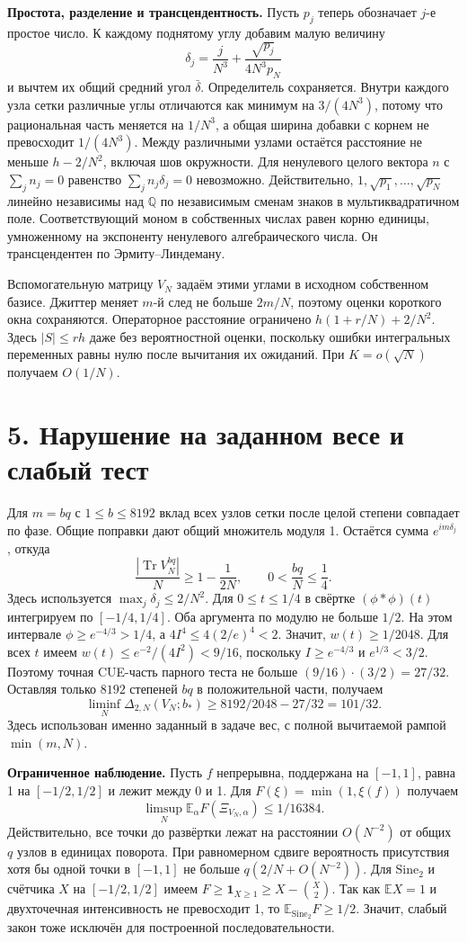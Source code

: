 \documentclass[11pt,a4paper]{article}
\newcommand{\Tr}{\operatorname{Tr}}
\newcommand{\EE}{\mathbb E}
\newcommand{\si}{\mathrm{Sine}_2}
\newcommand{\sect}[1]{\section*{\sffamily\color{ink}#1}}
\newcommand{\subt}[1]{\par\medskip\noindent\textbf{#1.}\quad}
\newcommand{\QQ}{\mathbb Q}
\begin{document}
\subt{Простота, разделение и трансцендентность}
Пусть \(p_j\) теперь обозначает \(j\)-е простое число. К каждому поднятому углу добавим малую величину
\[
          \delta_j=\frac{j}{N^3}
                   +\frac{\sqrt{p_j}}{4N^3p_N}
\]
и вычтем их общий средний угол \(\bar\delta\). Определитель сохраняется. Внутри каждого узла сетки различные углы отличаются как минимум на \(3/(4N^3)\), потому что рациональная часть меняется на \(1/N^3\), а общая ширина добавки с корнем не превосходит \(1/(4N^3)\). Между различными узлами остаётся расстояние не меньше \(h-2/N^2\), включая шов окружности. Для ненулевого целого вектора \(n\) с \(\sum_j n_j=0\) равенство \(\sum_j n_j\delta_j=0\) невозможно. Действительно, \(1,\sqrt{p_1},\ldots,\sqrt{p_N}\) линейно независимы над \(\QQ\) по независимым сменам знаков в мультиквадратичном поле. Соответствующий моном в собственных числах равен корню единицы, умноженному на экспоненту ненулевого алгебраического числа. Он трансцендентен по Эрмиту--Линдеману.

Вспомогательную матрицу \(V_N\) задаём этими углами в исходном собственном базисе. Джиттер меняет \(m\)-й след не больше \(2m/N\), поэтому оценки короткого окна сохраняются. Операторное расстояние ограничено \(h(1+r/N)+2/N^2\). Здесь \(|S|\le rh\) даже без вероятностной оценки, поскольку ошибки интегральных переменных равны нулю после вычитания их ожиданий. При \(K=o(\sqrt N)\) получаем \(O(1/N)\).

\newpage
\sect{5. Нарушение на заданном весе и слабый тест}
Для \(m=bq\) с \(1\le b\le8192\) вклад всех узлов сетки после целой степени совпадает по фазе. Общие поправки дают общий множитель модуля 1. Остаётся сумма \(e^{im\delta_j}\), откуда
\[
         \frac{|\Tr V_N^{bq}|}{N}\ge1-\frac{1}{2N},
       \qquad 0<\frac{bq}{N}\le\frac14 .
\]
Здесь используется \(\max_j\delta_j\le2/N^2\). Для \(0\le t\le1/4\) в свёртке \((\phi*\phi)(t)\) интегрируем по \([-1/4,1/4]\). Оба аргумента по модулю не больше \(1/2\). На этом интервале \(\phi\ge e^{-4/3}>1/4\), а \(4I^4\le4(2/e)^4<2\). Значит, \(w(t)\ge1/2048\). Для всех \(t\) имеем \(w(t)\le e^{-2}/(4I^2)<9/16\), поскольку \(I\ge e^{-4/3}\) и \(e^{1/3}<3/2\). Поэтому точная CUE-часть парного теста не больше \((9/16)\cdot(3/2)=27/32\). Оставляя только \(8192\) степеней \(bq\) в положительной части, получаем
\[
        \liminf_N\Delta_{2,N}(V_N;b_*)\ge
                          8192/2048-27/32=101/32 .
\]
Здесь использован именно заданный в задаче вес, с полной вычитаемой рампой \(\min(m,N)\).

\subt{Ограниченное наблюдение}
Пусть \(f\) непрерывна, поддержана на \([-1,1]\), равна 1 на \([-1/2,1/2]\) и лежит между 0 и 1. Для \(F(\xi)=\min(1,\xi(f))\) получаем
\[
                 \limsup_N\EE_\alpha F(\Xi_{V_N,\alpha})\le1/16384.
\]
Действительно, все точки до развёртки лежат на расстоянии \(O(N^{-2})\) от общих \(q\) узлов в единицах поворота. При равномерном сдвиге вероятность присутствия хотя бы одной точки в \([-1,1]\) не больше \(q(2/N+O(N^{-2}))\). Для \(\si\) и счётчика \(X\) на \([-1/2,1/2]\) имеем \(F\ge\mathbf1_{X\ge1}\ge X-\binom{X}{2}\). Так как \(\EE X=1\) и двухточечная интенсивность не превосходит 1, то \(\EE_{\si}F\ge1/2\). Значит, слабый закон тоже исключён для построенной последовательности.
\end{document}
